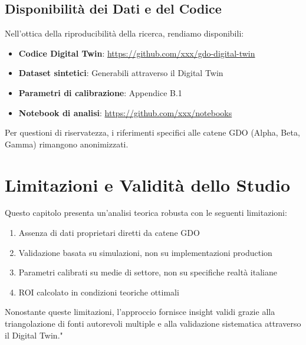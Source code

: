 \subsection*{Disponibilità dei Dati e del Codice}

Nell'ottica della riproducibilità della ricerca, rendiamo disponibili:
\begin{itemize}
    \item \textbf{Codice Digital Twin}: \url{https://github.com/xxx/gdo-digital-twin}
    \item \textbf{Dataset sintetici}: Generabili attraverso il Digital Twin
    \item \textbf{Parametri di calibrazione}: Appendice B.1
    \item \textbf{Notebook di analisi}: \url{https://github.com/xxx/notebooks}
\end{itemize}

Per questioni di riservatezza, i riferimenti specifici alle catene 
GDO (Alpha, Beta, Gamma) rimangono anonimizzati.

\section{\texorpdfstring{\textbf{Limitazioni e Validità dello Studio}}{2.8 - Limitazioni e Validità dello Studio}}

Questo capitolo presenta un'analisi teorica robusta con le seguenti limitazioni:
\begin{enumerate}
    \item Assenza di dati proprietari diretti da catene GDO
    \item Validazione basata su simulazioni, non su implementazioni production
    \item Parametri calibrati su medie di settore, non su specifiche realtà italiane
    \item ROI calcolato in condizioni teoriche ottimali
\end{enumerate}

Nonostante queste limitazioni, l'approccio fornisce insight validi 
grazie alla triangolazione di fonti autorevoli multiple e alla 
validazione sistematica attraverso il Digital Twin."

\clearpage
\printbibliography[
    heading=subbibliography,
    title={Riferimenti Bibliografici del Capitolo 2},
]

\endrefsection